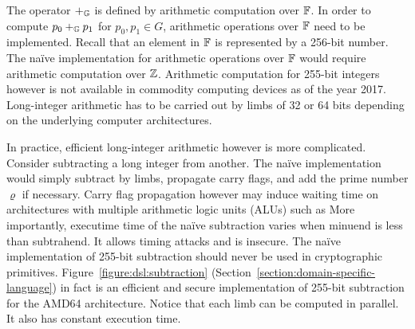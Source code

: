  
The operator $+_{\mathbb{G}}$ is defined by arithmetic computation over
$\mathbb{F}$. In order to compute $p_0 +_{\mathbb{G}} p_1$ for $p_0, p_1 \in G$,
arithmetic operations over $\mathbb{F}$ need to be implemented. Recall that
an element in $\mathbb{F}$ is represented by a 256-bit number. The na\"ive
implementation for arithmetic operations over $\mathbb{F}$ would require
arithmetic computation over $\mathbb{Z}$. Arithmetic computation for
255-bit integers however is not available in commodity computing
devices as of the year 2017. Long-integer arithmetic has to be carried
out by limbs of 32 or 64 bits depending on the underlying computer
architectures.

In practice, efficient long-integer arithmetic however is more
complicated. Consider subtracting a long integer from another. The
na\"ive implementation would simply subtract by limbs, propagate carry
flags, and add the prime number $\varrho$ if necessary. Carry flag
propagation however may induce waiting time on architectures with
multiple arithmetic logic units (ALUs) such as  
More importantly, executime time of the na\"ive subtraction varies
when minuend is less than subtrahend. It allows timing attacks and is
insecure. The na\"ive implementation of 255-bit subtraction should
never be used in cryptographic primitives. 
Figure~\ref{figure:dsl:subtraction}
(Section~\ref{section:domain-specific-language}) in fact is an
efficient and secure implementation of 255-bit subtraction for the
AMD64 architecture. Notice that each limb can be computed in
parallel. It also has constant execution time. 

